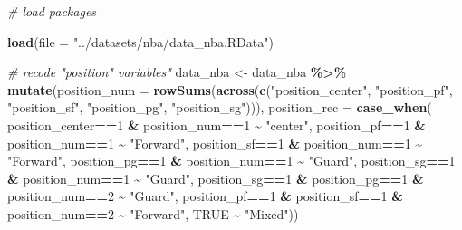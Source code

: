 \documentclass[
]{book}
\newenvironment{Shaded}{\begin{snugshade}}{\end{snugshade}}
\newcommand{\AttributeTok}[1]{\textcolor[rgb]{0.13,0.29,0.53}{#1}}
\newcommand{\CommentTok}[1]{\textcolor[rgb]{0.56,0.35,0.01}{\textit{#1}}}
\newcommand{\ConstantTok}[1]{\textcolor[rgb]{0.56,0.35,0.01}{#1}}
\newcommand{\DecValTok}[1]{\textcolor[rgb]{0.00,0.00,0.81}{#1}}
\newcommand{\FunctionTok}[1]{\textcolor[rgb]{0.13,0.29,0.53}{\textbf{#1}}}
\newcommand{\NormalTok}[1]{#1}
\newcommand{\OtherTok}[1]{\textcolor[rgb]{0.56,0.35,0.01}{#1}}
\newcommand{\SpecialCharTok}[1]{\textcolor[rgb]{0.81,0.36,0.00}{\textbf{#1}}}
\newcommand{\StringTok}[1]{\textcolor[rgb]{0.31,0.60,0.02}{#1}}
\begin{document}
\begin{Shaded}
\begin{Highlighting}[]
\CommentTok{\# load packages}

\FunctionTok{load}\NormalTok{(}\AttributeTok{file =} \StringTok{"../datasets/nba/data\_nba.RData"}\NormalTok{)}



\CommentTok{\# recode "position" variables"}
\NormalTok{data\_nba }\OtherTok{\textless{}{-}}\NormalTok{ data\_nba }\SpecialCharTok{\%\textgreater{}\%}
  \FunctionTok{mutate}\NormalTok{(}\AttributeTok{position\_num =} \FunctionTok{rowSums}\NormalTok{(}\FunctionTok{across}\NormalTok{(}\FunctionTok{c}\NormalTok{(}\StringTok{"position\_center"}\NormalTok{, }\StringTok{"position\_pf"}\NormalTok{, }\StringTok{"position\_sf"}\NormalTok{,}
                                         \StringTok{"position\_pg"}\NormalTok{, }\StringTok{"position\_sg"}\NormalTok{))),}
         \AttributeTok{position\_rec =} 
           \FunctionTok{case\_when}\NormalTok{(}
\NormalTok{             position\_center}\SpecialCharTok{==}\DecValTok{1} \SpecialCharTok{\&}\NormalTok{ position\_num}\SpecialCharTok{==}\DecValTok{1} \SpecialCharTok{\textasciitilde{}} \StringTok{"center"}\NormalTok{,}
\NormalTok{             position\_pf}\SpecialCharTok{==}\DecValTok{1} \SpecialCharTok{\&}\NormalTok{ position\_num}\SpecialCharTok{==}\DecValTok{1} \SpecialCharTok{\textasciitilde{}} \StringTok{"Forward"}\NormalTok{,}
\NormalTok{             position\_sf}\SpecialCharTok{==}\DecValTok{1} \SpecialCharTok{\&}\NormalTok{ position\_num}\SpecialCharTok{==}\DecValTok{1} \SpecialCharTok{\textasciitilde{}} \StringTok{"Forward"}\NormalTok{,}
\NormalTok{             position\_pg}\SpecialCharTok{==}\DecValTok{1} \SpecialCharTok{\&}\NormalTok{ position\_num}\SpecialCharTok{==}\DecValTok{1} \SpecialCharTok{\textasciitilde{}} \StringTok{"Guard"}\NormalTok{,}
\NormalTok{             position\_sg}\SpecialCharTok{==}\DecValTok{1} \SpecialCharTok{\&}\NormalTok{ position\_num}\SpecialCharTok{==}\DecValTok{1} \SpecialCharTok{\textasciitilde{}} \StringTok{"Guard"}\NormalTok{,}
\NormalTok{             position\_sg}\SpecialCharTok{==}\DecValTok{1} \SpecialCharTok{\&}\NormalTok{ position\_pg}\SpecialCharTok{==}\DecValTok{1} \SpecialCharTok{\&}\NormalTok{ position\_num}\SpecialCharTok{==}\DecValTok{2} \SpecialCharTok{\textasciitilde{}} \StringTok{"Guard"}\NormalTok{,}
\NormalTok{             position\_pf}\SpecialCharTok{==}\DecValTok{1} \SpecialCharTok{\&}\NormalTok{ position\_sf}\SpecialCharTok{==}\DecValTok{1} \SpecialCharTok{\&}\NormalTok{ position\_num}\SpecialCharTok{==}\DecValTok{2} \SpecialCharTok{\textasciitilde{}} \StringTok{"Forward"}\NormalTok{,}
             \ConstantTok{TRUE} \SpecialCharTok{\textasciitilde{}} \StringTok{"Mixed"}\NormalTok{))}


\end{Highlighting}
\end{Shaded}
\end{document}
